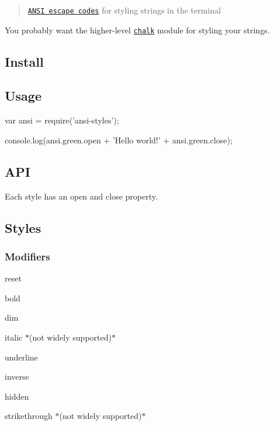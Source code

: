 \begin{quote}
\href{http://en.wikipedia.org/wiki/ANSI_escape_code#Colors_and_Styles}{\tt A\+N\+S\+I escape codes} for styling strings in the terminal \end{quote}


You probably want the higher-\/level \href{https://github.com/chalk/chalk}{\tt chalk} module for styling your strings.



\subsection*{Install}




\subsection*{Usage}


\begin{DoxyCode}
var ansi = require(\textcolor{stringliteral}{'ansi-styles'});

console.log(ansi.green.open + \textcolor{stringliteral}{'Hello world!'} + ansi.green.close);
\end{DoxyCode}


\subsection*{A\+P\+I}

Each style has an {\ttfamily open} and {\ttfamily close} property.

\subsection*{Styles}

\subsubsection*{Modifiers}


\begin{DoxyItemize}
\item {\ttfamily reset}
\item {\ttfamily bold}
\item {\ttfamily dim}
\item {\ttfamily italic} $\ast$(not widely supported)$\ast$
\item {\ttfamily underline}
\item {\ttfamily inverse}
\item {\ttfamily hidden}
\item {\ttfamily strikethrough} $\ast$(not widely supported)$\ast$
\end{DoxyItemize}

